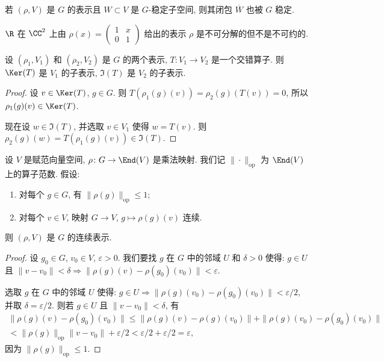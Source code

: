 \begin{remark}[$G$-稳定子空间的闭包]
\label{rem:I.3.1.7}
若 $(\rho, V)$ 是 $G$ 的表示且 $W \subset V$ 是 $G$-稳定子空间, 则其闭包 $\overline{W}$ 也被 $G$ 稳定.
\end{remark}

\begin{example}[不可分解但不不可约的表示]
\label{exa:I.3.1.8}
$\R$ 在 $\CC^2$ 上由 $\rho(x) = \begin{pmatrix} 1 & x \\ 0 & 1 \end{pmatrix}$ 给出的表示 $\rho$ 是不可分解的但不是不可约的.
\end{example}

\begin{lemma}[交错算子的核与像]
\label{lem:I.3.1.9}
设 $(\rho_1, V_1)$ 和 $(\rho_2, V_2)$ 是 $G$ 的两个表示, $T \colon V_1 \to V_2$ 是一个交错算子. 则 $\Ker(T)$ 是 $V_1$ 的子表示, $\Im(T)$ 是 $V_2$ 的子表示.
\end{lemma}

\begin{proof}
设 $v \in \Ker(T)$, $g \in G$. 则 $T(\rho_1(g)(v)) = \rho_2(g)(T(v)) = 0$, 所以 $\rho_1(g)(v) \in \Ker(T)$.

现在设 $w \in \Im(T)$, 并选取 $v \in V_1$ 使得 $w = T(v)$. 则 $\rho_2(g)(w) = T(\rho_1(g)(v)) \in \Im(T)$.
\end{proof}

\begin{proposition}[连续表示的一个判定]
\label{prop:I.3.1.10}
设 $V$ 是赋范向量空间, $\rho \colon G \to \End(V)$ 是乘法映射. 我们记 $\|\cdot\|_{\mathrm{op}}$ 为 $\End(V)$ 上的算子范数. 假设:
\begin{enumerate}
\item[(a)] 对每个 $g \in G$, 有 $\|\rho(g)\|_{\mathrm{op}} \leq 1$;
\item[(b)] 对每个 $v \in V$, 映射 $G \to V$, $g \longmapsto \rho(g)(v)$ 连续.
\end{enumerate}
则 $(\rho, V)$ 是 $G$ 的连续表示.
\end{proposition}

\begin{proof}
设 $g_0 \in G$, $v_0 \in V$, $\varepsilon > 0$. 我们要找 $g$ 在 $G$ 中的邻域 $U$ 和 $\delta > 0$ 使得: $g \in U$ 且 $\|v - v_0\| < \delta \Rightarrow \|\rho(g)(v) - \rho(g_0)(v_0)\| < \varepsilon$.

选取 $g$ 在 $G$ 中的邻域 $U$ 使得: $g \in U \Rightarrow \|\rho(g)(v_0) - \rho(g_0)(v_0)\| < \varepsilon/2$, 并取 $\delta = \varepsilon/2$. 则若 $g \in U$ 且 $\|v - v_0\| < \delta$, 有
\begin{multline*}
\|\rho(g)(v) - \rho(g_0)(v_0)\| \leq \|\rho(g)(v) - \rho(g)(v_0)\| + \|\rho(g)(v_0) - \rho(g_0)(v_0)\| \\
< \|\rho(g)\|_{\mathrm{op}}\|v - v_0\| + \varepsilon/2 < \varepsilon/2 + \varepsilon/2 = \varepsilon,
\end{multline*}
因为 $\|\rho(g)\|_{\mathrm{op}} \leq 1$.
\end{proof}

